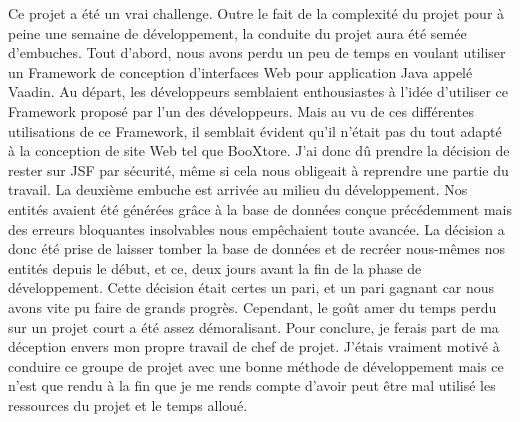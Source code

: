 \begin{description}
	Ce projet a été un vrai challenge. Outre le fait de la complexité du projet pour à peine une semaine de développement, la conduite du projet aura été semée d’embuches. Tout d’abord, nous avons perdu un peu de temps en voulant utiliser un Framework de conception d’interfaces Web pour application Java appelé Vaadin. Au départ, les développeurs semblaient enthousiastes à l’idée d’utiliser ce Framework proposé par l’un des développeurs. Mais au vu de ces différentes utilisations de ce Framework, il semblait évident qu’il n’était pas du tout adapté à la conception de site Web tel que BooXtore. J’ai donc dû prendre la décision de rester sur JSF par sécurité, même si cela nous obligeait à reprendre une partie du travail. La deuxième embuche est arrivée au milieu du développement. Nos entités avaient été générées grâce à la base de données conçue précédemment mais des erreurs bloquantes insolvables nous empêchaient toute avancée. La décision a donc été prise de laisser tomber la base de données et de recréer nous-mêmes nos entités depuis le début, et ce, deux jours avant la fin de la phase de développement. Cette décision était certes un pari, et un pari gagnant car nous avons vite pu faire de grands progrès. Cependant, le goût amer du temps perdu sur un projet court a été assez démoralisant.
	Pour conclure, je ferais part de ma déception envers mon propre travail de chef de projet. J’étais vraiment motivé à conduire ce groupe de projet avec une bonne méthode de développement mais ce n’est que rendu à la fin que je me rends compte d’avoir peut être mal utilisé les ressources du projet et le temps alloué.

\end{description}
